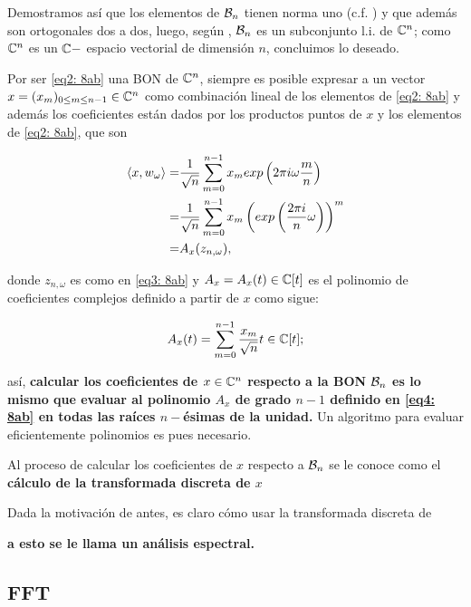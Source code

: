 Demostramos así que los elementos de $\mathcal{B}_{n}$
tienen norma uno (c.f. ) y que además
son ortogonales
dos a dos, luego, según , $\mathcal{B}_{n}$ es un subconjunto l.i. 
de $\mathbb{C}^{n}$; como $\mathbb{C}^{n}$ es un $\mathbb{C}-$ espacio vectorial de 
dimensión $n$, concluimos lo deseado.
\QEDB
\vspace{0.2cm}

Por ser \eqref{eq2: 8ab} una BON de $\mathbb{C}^{n}$, siempre es
posible expresar a un vector $x = (x_{m})_{0 \leq m \leq n-1} \in \mathbb{C}^{n}$
como combinación lineal de los elementos de \eqref{eq2: 8ab}
y además los coeficientes están dados por los productos puntos
de $x$ y los elementos de \eqref{eq2: 8ab}, que son

\begin{align*}
\langle x, w_{\omega} \rangle = & 
\frac{1}{\sqrt{n}} \sum\limits_{m=0}^{n-1}x_{m} exp \left(
2 \pi i \omega \frac{m}{n}
\right) \\
= & 
\frac{1}{\sqrt{n}} \sum\limits_{m=0}^{n-1}x_{m} 
\left(
exp \left( \frac{2 \pi i }{n} \omega
\right) \right)^{m} \\
= & A_{x}(z_{n, \omega}),
\end{align*}


\noindent
donde $z_{n, \omega}$ es como en \eqref{eq3: 8ab} y 
$A_{x} = A_{x}(t) \in \mathbb{C}[t]$ es el polinomio de 
coeficientes complejos definido 
a partir de $x$ como sigue:

	\begin{equation}
		\label{eq4: 8ab}
		A_{x}(t) = \sum\limits_{m=0}^{n-1}\frac{x_{m}}{\sqrt{n}} t\in \mathbb{C}[t];
	\end{equation}

\noindent
así, \textbf{calcular los coeficientes de $x \in \mathbb{C}^{n}$ respecto
a la BON $\mathcal{B}_{n}$ es lo mismo que evaluar al polinomio 
$A_{x}$ de grado $n-1$ definido en \eqref{eq4: 8ab} en todas las raíces
$n-$ésimas de la unidad.} Un algoritmo para evaluar eficientemente
polinomios es pues necesario.

\begin{defi}
Al proceso de calcular los coeficientes de $x$
respecto a $\mathcal{B}_{n}$
se le conoce como el \textbf{cálculo de la 
transformada discreta de $x$}
\end{defi}


Dada la motivación de antes, es claro cómo usar la transformada
discreta de 

\textbf{a esto se le llama un análisis espectral.}

\subsection{FFT}





















